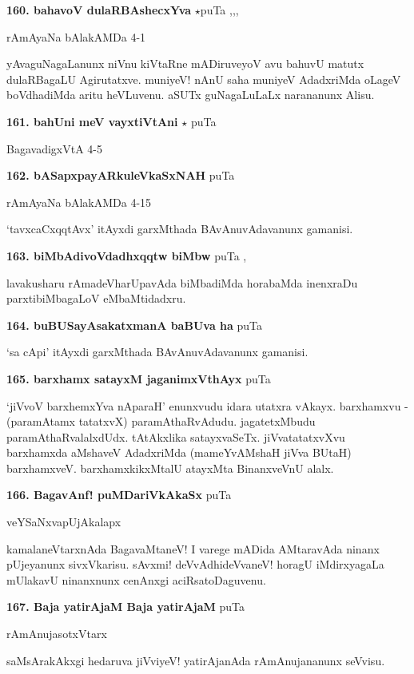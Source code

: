 \medskip
\noindent\textbf{160. bahavoV dulaRBAshecxYva} $\star$\hfill puTa \pageref{163a},\pageref{194a},\pageref{219a},\pageref{247c}

\hfill rAmAyaNa bAlakAMDa 4-1

yAvaguNagaLanunx niVnu kiVtaRne mADiruveyoV avu bahuvU matutx dulaRBagaLU Agirutatxve. muniyeV! nAnU saha muniyeV AdadxriMda oLageV boVdhadiMda aritu heVLuvenu. aSUTx guNagaLuLaLx narananunx Alisu.

\medskip
\noindent\textbf{161. bahUni meV vayxtiVtAni} $\star$ \hfill puTa \pageref{91a}

\hfill BagavadigxVtA 4-5

\medskip
\noindent\textbf{162. bASapxpayARkuleVkaSxNAH} \hfill puTa \pageref{211b}

\hfill rAmAyaNa bAlakAMDa 4-15

`tavxcaCxqqtAvx' itAyxdi garxMthada BAvAnuvAdavanunx gamanisi.

\medskip
\noindent\textbf{163. biMbAdivoVdadhxqqtw biMbw} \hfill puTa \pageref{167b},\pageref{228a}

lavakusharu rAmadeVharUpavAda biMbadiMda horabaMda inenxraDu parxtibiMbagaLoV eMbaMtidadxru.

\medskip
\noindent\textbf{164. buBUSayAsakatxmanA baBUva ha} \hfill puTa \pageref{211c}

`sa cApi' itAyxdi garxMthada BAvAnuvAdavanunx gamanisi.

\medskip
\noindent\textbf{165. barxhamx satayxM jaganimxVthAyx} \hfill puTa \pageref{54a}

\hfill `jiVvoV barxhemxYva nAparaH' enunxvudu idara utatxra vAkayx. barxhamxvu - (paramAtamx tatatxvX) paramAthaRvAdudu. jagatetxMbudu paramAthaRvalalxdUdx. tAtAkxlika satayxvaSeTx. jiVvatatatxvXvu barxhamxda aMshaveV AdadxriMda (mameYvAMshaH jiVva BUtaH) barxhamxveV. barxhamxkikxMtalU atayxMta BinanxveVnU alalx.

\medskip
\noindent\textbf{166. BagavAnf! puMDariVkAkaSx} \hfill puTa \pageref{115a}

\hfill veYSaNxvapUjAkalapx

kamalaneVtarxnAda BagavaMtaneV! I varege mADida AMtaravAda ninanx pUjeyanunx sivxVkarisu. sAvxmi! deVvAdhideVvaneV! horagU iMdirxyagaLa mUlakavU ninanxnunx cenAnxgi aciRsatoDaguvenu.

\medskip
\noindent\textbf{167. Baja yatirAjaM Baja yatirAjaM} \hfill puTa \pageref{46}

\hfill rAmAnujasotxVtarx

saMsArakAkxgi hedaruva jiVviyeV! yatirAjanAda rAmAnujananunx seVvisu.


